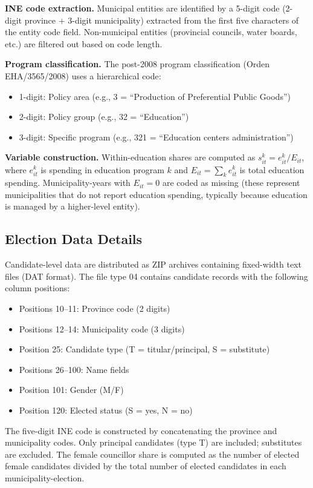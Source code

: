 \documentclass[12pt]{article}
\begin{document}
\textbf{INE code extraction.} Municipal entities are identified by a 5-digit code (2-digit province + 3-digit municipality) extracted from the first five characters of the entity code field. Non-municipal entities (provincial councils, water boards, etc.) are filtered out based on code length.

\textbf{Program classification.} The post-2008 program classification (Orden EHA/3565/2008) uses a hierarchical code:
\begin{itemize}
    \item 1-digit: Policy area (e.g., 3 = ``Production of Preferential Public Goods'')
    \item 2-digit: Policy group (e.g., 32 = ``Education'')
    \item 3-digit: Specific program (e.g., 321 = ``Education centers administration'')
\end{itemize}

\textbf{Variable construction.} Within-education shares are computed as $s_{it}^k = e_{it}^k / E_{it}$, where $e_{it}^k$ is spending in education program $k$ and $E_{it} = \sum_k e_{it}^k$ is total education spending. Municipality-years with $E_{it} = 0$ are coded as missing (these represent municipalities that do not report education spending, typically because education is managed by a higher-level entity).

\subsection{Election Data Details}

Candidate-level data are distributed as ZIP archives containing fixed-width text files (DAT format). The file type 04 contains candidate records with the following column positions:

\begin{itemize}
    \item Positions 10--11: Province code (2 digits)
    \item Positions 12--14: Municipality code (3 digits)
    \item Position 25: Candidate type (T = titular/principal, S = substitute)
    \item Positions 26--100: Name fields
    \item Position 101: Gender (M/F)
    \item Position 120: Elected status (S = yes, N = no)
\end{itemize}

The five-digit INE code is constructed by concatenating the province and municipality codes. Only principal candidates (type T) are included; substitutes are excluded. The female councillor share is computed as the number of elected female candidates divided by the total number of elected candidates in each municipality-election.
\end{document}
